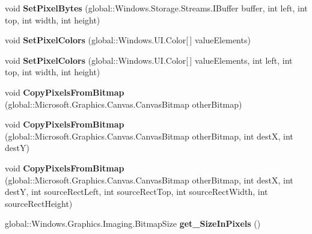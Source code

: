 \begin{DoxyCompactItemize}
void {\bfseries Set\+Pixel\+Bytes} (global\+::\+Windows.\+Storage.\+Streams.\+I\+Buffer buffer, int left, int top, int width, int height)
\item 
\mbox{\label{interface_microsoft_1_1_graphics_1_1_canvas_1_1_i_canvas_bitmap_a925c9f849cf70be981d86d4e4aad1bd0}} 
void {\bfseries Set\+Pixel\+Colors} (global\+::\+Windows.\+U\+I.\+Color\mbox{[}$\,$\mbox{]} value\+Elements)
\item 
\mbox{\label{interface_microsoft_1_1_graphics_1_1_canvas_1_1_i_canvas_bitmap_ad139947e5dfa06e8b880c01a19016cf7}} 
void {\bfseries Set\+Pixel\+Colors} (global\+::\+Windows.\+U\+I.\+Color\mbox{[}$\,$\mbox{]} value\+Elements, int left, int top, int width, int height)
\item 
\mbox{\label{interface_microsoft_1_1_graphics_1_1_canvas_1_1_i_canvas_bitmap_a6e4c4209ff55c072d09a51c00a9d4653}} 
void {\bfseries Copy\+Pixels\+From\+Bitmap} (global\+::\+Microsoft.\+Graphics.\+Canvas.\+Canvas\+Bitmap other\+Bitmap)
\item 
\mbox{\label{interface_microsoft_1_1_graphics_1_1_canvas_1_1_i_canvas_bitmap_a5ab0cddef05eb80cffded7b872aacc34}} 
void {\bfseries Copy\+Pixels\+From\+Bitmap} (global\+::\+Microsoft.\+Graphics.\+Canvas.\+Canvas\+Bitmap other\+Bitmap, int destX, int destY)
\item 
\mbox{\label{interface_microsoft_1_1_graphics_1_1_canvas_1_1_i_canvas_bitmap_a6300f60ab1f71c5032c2680ae66ec957}} 
void {\bfseries Copy\+Pixels\+From\+Bitmap} (global\+::\+Microsoft.\+Graphics.\+Canvas.\+Canvas\+Bitmap other\+Bitmap, int destX, int destY, int source\+Rect\+Left, int source\+Rect\+Top, int source\+Rect\+Width, int source\+Rect\+Height)
\item 
\mbox{\label{interface_microsoft_1_1_graphics_1_1_canvas_1_1_i_canvas_bitmap_af2b4e8d31f7d4a3d849dc0f156a59a7e}} 
global\+::\+Windows.\+Graphics.\+Imaging.\+Bitmap\+Size {\bfseries get\+\_\+\+Size\+In\+Pixels} ()

\end{DoxyCompactItemize}
